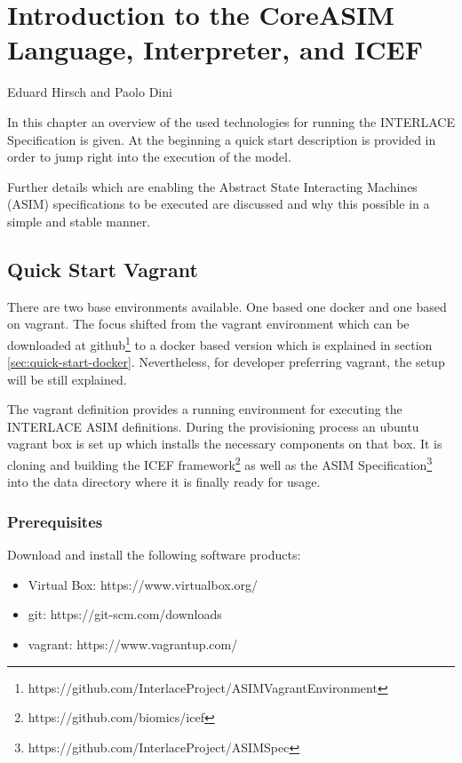 \chapter{Introduction to the CoreASIM Language, Interpreter, and ICEF}
\label{ch:CoreAsimIntro}

\vspace{-1cm}
\begin{center}
Eduard Hirsch and Paolo Dini
\end{center}

In this chapter an overview of the used technologies for running the INTERLACE Specification is given. At the beginning a quick start description is provided in order to jump right into the execution of the model.

Further details which are enabling the Abstract State Interacting Machines (ASIM) specifications to be executed are discussed and why this possible in a simple and stable manner.

\section{Quick Start Vagrant}
\label{sec:quick-start-vagrant}

There are two base environments available. One based one docker and one based on vagrant. The focus shifted from the vagrant environment which can be downloaded at github\footnote{https://github.com/InterlaceProject/ASIMVagrantEnvironment} to a docker based version which is explained in section \ref{sec:quick-start-docker}. Nevertheless, for developer preferring vagrant, the setup will be still explained.

The vagrant definition provides a running environment for executing the INTERLACE ASIM definitions. During the provisioning process an ubuntu vagrant box is set up which installs the necessary components on that box. It is cloning and building the ICEF framework\footnote{https://github.com/biomics/icef} as well as the ASIM Specification\footnote{https://github.com/InterlaceProject/ASIMSpec} into the data directory where it is finally ready for usage.

\subsection{Prerequisites}

Download and install the following software products:

\begin{itemize}
	\item Virtual Box: https://www.virtualbox.org/
	\item git: https://git-scm.com/downloads
	\item vagrant: https://www.vagrantup.com/
\end{itemize}

